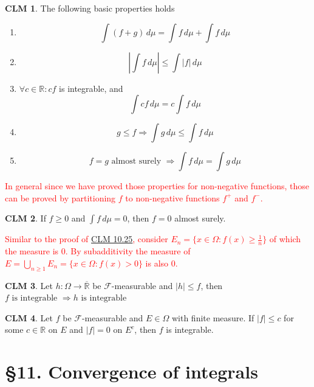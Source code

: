 \documentclass[hidelinks]{article}
\theoremstyle{definition}
\theoremstyle{dotless}
\newtheorem{claim}{CLM}[section]
\theoremstyle{remark}
\begin{document}
\begin{claim}
The following basic properties holds
\begin{enumerate}[label=\arabic*\degree]
    \item\[\int(f+g)\,d\mu=\int f\,d\mu+\int f\,d\mu\]
    \item\[|\int f\,d\mu|\leq\int|f|\,d\mu\]
    \item$\forall c\in\mathbb{R}:cf$ is integrable, and
    \[\int cf\,d\mu=c\int f\,d\mu\]
    \item\[g\leq f\Rightarrow\int g\,d\mu\leq\int f\,d\mu\]
    \item\[f=g\textrm{ almost surely }\Rightarrow\int f\,d\mu=\int g\,d\mu\]
\end{enumerate}
\end{claim}
\textcolor{red}{In general since we have proved those properties for non-negative functions, those can be proved by partitioning $f$ to non-negative functions $f^+$ and $f^-$.}

\begin{claim}
If $f\geq0$ and $\int f\,d\mu=0$, then $f=0$ almost surely.
\end{claim}
\textcolor{red}{Similar to the proof of \hyperref[CLM 10.25]{CLM 10.25}, consider $E_n=\{x\in\Omega:f(x)\geq\frac{1}{n}\}$ of which the measure is $0$. By subadditivity the measure of $E=\bigcup_{n\geq1}E_n=\{x\in\Omega:f(x)>0\}$ is also $0$.}

\begin{claim}
Let $h:\Omega\to\overline{\mathbb{R}}$ be $\mathscr{F}$-measurable and $|h|\leq f$, then $f\textrm{ is integrable }\Rightarrow h\textrm{ is integrable}$
\end{claim}

\begin{claim}
Let $f$ be $\mathscr{F}$-measurable and $E\in\Omega$ with finite measure. If $|f|\leq c$ for some $c\in\mathbb{R}$ on $E$ and $|f|=0$ on $E^c$, then $f$  is integrable.
\end{claim}

\bigbreak

\section*{\S11. Convergence of integrals}
\setcounter{section}{11}
\end{document}
